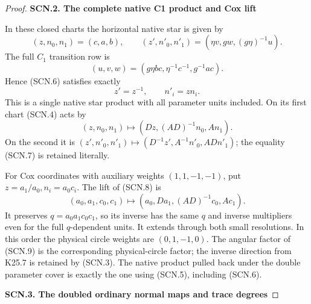 \begin{proof}
\par

\medskip\noindent\textbf{SCN.2. The complete native C1 product and Cox lift}

\par\nobreak

In these closed charts the horizontal native star is given by
\[
 (z,n_0,n_1)=(c,a,b),\qquad
 (z',n'_0,n'_1)=(\eta v,g w,(g\eta)^{-1}u).
                                                        \tag{SCN.6}
\]
The full \(C_1\) transition row is
\[
              (u,v,w)=(g\eta bc,\eta^{-1}c^{-1},g^{-1}ac).
\]
Hence (SCN.6) satisfies exactly
\[
                         z'=z^{-1},\qquad n'_i=zn_i.
                                                        \tag{SCN.7}
\]
This is a single native star product with all parameter units
included. On its first chart (SCN.4) acts by
\[
                 (z,n_0,n_1)\mapsto
                    (Dz,(AD)^{-1}n_0,An_1).
                                                        \tag{SCN.8}
\]
On the second it is
\((z',n'_0,n'_1)\mapsto(D^{-1}z',A^{-1}n'_0,ADn'_1)\);
the equality (SCN.7) is retained literally.

For Cox coordinates with auxiliary weights \((1,1,-1,-1)\),
put \(z=a_1/a_0,n_i=a_0c_i\). The lift of (SCN.8) is
\[
 (a_0,a_1,c_0,c_1)\mapsto
       (a_0,D a_1,(AD)^{-1}c_0,Ac_1).                \tag{SCN.9}
\]
It preserves \(q=a_0a_1c_0c_1\), so its inverse has the same
\(q\) and inverse multipliers even for the full \(q\)-dependent
units. It extends through both small resolutions. In this order
the physical circle weights are \((0,1,-1,0)\). The angular
factor of (SCN.9) is the corresponding physical-circle factor;
the inverse direction from K25.7 is retained by (SCN.3).
The native product pulled back under the double parameter cover
is exactly the one using (SCN.5), including (SCN.6).

\par

\medskip\noindent\textbf{SCN.3. The doubled ordinary normal maps and trace degrees}

\par\nobreak


\end{proof}
